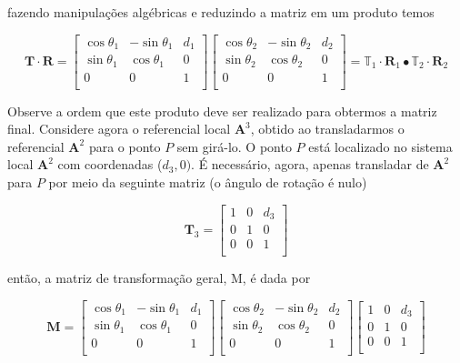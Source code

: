 \noindent fazendo manipulações algébricas e reduzindo a matriz em um produto temos

\[
\mathbf{T}\cdot\mathbf{R} = \begin{bmatrix}
	\cos\theta_1 & -\sin\theta_1 & d_1\\
	\sin\theta_1 & \cos\theta_1 & 0\\
	0 & 0 & 1\\
\end{bmatrix}
\begin{bmatrix}
	\cos\theta_2 & -\sin\theta_2 & d_2\\
	\sin\theta_2 & \cos\theta_2 & 0\\
	0 & 0 & 1\\
\end{bmatrix}
=
\mathbb{T}_1\cdot\mathbf{R}_1 \bullet \mathbb{T}_2\cdot\mathbf{R}_2
\]

Observe a ordem que este produto deve ser realizado para obtermos a matriz final. Considere agora o referencial local $\mathbf{A}^3$, obtido ao transladarmos o referencial $\mathbf{A}^2$ para o ponto $P$ sem girá-lo. O ponto $P$ está localizado no sistema local $\mathbf{A}^2$ com coordenadas ($d_3, 0)$. É necessário, agora, apenas transladar de $\mathbf{A}^2$ para $P$ por meio da seguinte matriz (o ângulo de rotação é nulo)

\[
\mathbf{T}_3 = \begin{bmatrix}
	1 & 0 & d_3\\
	0 & 1 & 0\\
	0 & 0 & 1\\
\end{bmatrix}
\]

\noindent então, a matriz de transformação geral, M, é dada por 

\[
\mathbf{M} = \begin{bmatrix}
	\cos\theta_1 & -\sin\theta_1 & d_1\\
	\sin\theta_1 & \cos\theta_1 & 0\\
	0 & 0 & 1\\
\end{bmatrix}
\begin{bmatrix}
	\cos\theta_2 & -\sin\theta_2 & d_2\\
	\sin\theta_2 & \cos\theta_2 & 0\\
	0 & 0 & 1\\
\end{bmatrix}
\begin{bmatrix}
	1 & 0 & d_3\\
	0 & 1 & 0\\
	0 & 0 & 1\\
\end{bmatrix}
\]


